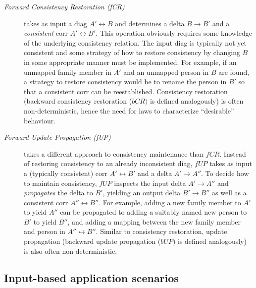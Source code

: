 \begin{description}
\item[\emph{Forward Consistency Restoration (fCR)}] takes as input a diag $A' \leftrightarrow B$ and determines a delta $B \rightarrow B'$ and a \emph{consistent} corr $A' \leftrightarrow B'$.
This operation obviously requires some knowledge of the underlying consistency relation.
The input diag is typically not yet consistent and some strategy of how to restore consistency by changing $B$ in some appropriate manner must be implemented.
For example, if an unmapped family member in $A'$ and an unmapped person in $B$ are found, a strategy to restore consistency would be to rename the person in $B'$ so that a consistent corr can be reestablished.
Consistency restoration (backward consistency restoration ($bCR)$ is defined analogously) is often non-deterministic, hence the need for laws to characterize ``desirable'' behaviour.

\item[\emph{Forward Update Propagation (fUP)}] takes a different approach to consistency maintenance than $fCR$.
Instead of restoring consistency to an already inconsistent diag, $fUP$ takes as input a (typically consistent) corr $A' \leftrightarrow B'$ and a delta $A' \rightarrow A''$.
To decide how to maintain consistency, $fUP$ inspects the input delta $A' \rightarrow A''$ and \emph{propagates} the delta to $B'$, yielding an output delta $B' \rightarrow B''$ as well as a consistent corr $A'' \leftrightarrow B''$.
For example, adding a new family member to $A'$ to yield $A''$ can be propagated to adding a suitably named new person to $B'$ to yield $B''$, and adding a mapping between the new family member and person in $A'' \leftrightarrow B''$.  
Similar to consistency restoration, update propagation (backward update propagation ($bUP)$ is defined analogously) is also often non-deterministic.
\end{description}

\subsection{Input-based application scenarios}
\label{sec:application-scenarios}

